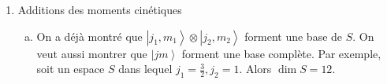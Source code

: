 \documentclass[10pt]{report}
\newcommand{\ket}[1]{\left|#1\right>}
\begin{document}
\begin{enumerate}[1)]
\begin{enumerate}[a)]
                Nous devons donc maintenant verifier que $\left[ J^2, J_1^2 \right] = \left[ J_1^2 + J_2^2 + 2\vec{J}_1\cdot \vec{J}_2 ,J_1^2\right] = 0$ et que 
                \begin{align}
                    \left[ J^2,J_{1z} \right] &= \left[  J_1^2 + J_2^2 + 2\vec{J}_1\cdot \vec{J}_2, J_{1z}\right]\\
                    &= 2\left[ J_{1x}J_{2x} + J_{1y}J_{2y},J_{1z} \right]\\
                    &= 2i\hbar\left( -J_{1y}J_{2x} + J_{1x}J_{2y} \right) \neq 0
                \end{align}
                et donc $\left[ J^2, J_{1z} \right] \neq 0$.
        \end{enumerate}
    \item Additions des moments cin\'etiques
        \begin{enumerate}[a)]
            \item On a d\'ej\`a montr\'e que $\ket{j_1, m_1} \otimes \ket{j_2, m_2}$ forment une base de $S$. On veut aussi montrer que $\ket{jm}$ forment une base compl\`ete. Par exemple, soit un espace $S$ dans lequel $j_1 = \frac{3}{2}, j_2 = 1$. Alors $\dim S = 12$.


\end{enumerate}
\end{enumerate}
\end{document}
